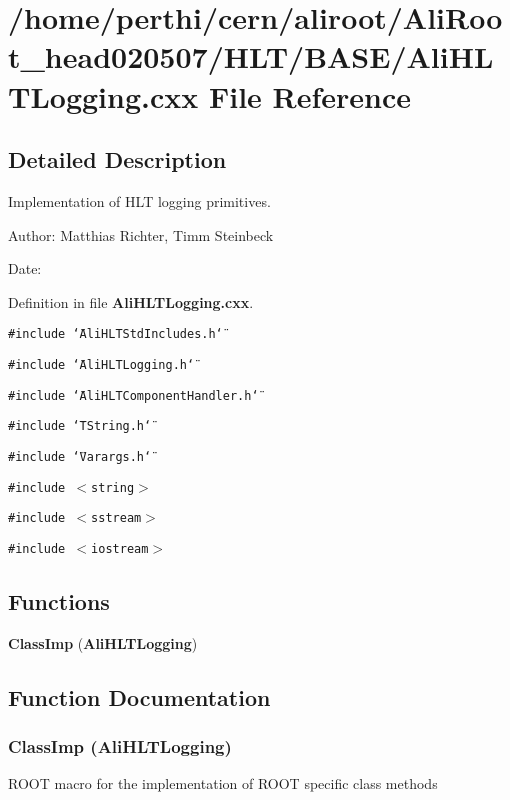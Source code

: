 \section{/home/perthi/cern/aliroot/Ali\-Root\_\-head020507/HLT/BASE/Ali\-HLTLogging.cxx File Reference}
\label{AliHLTLogging_8cxx}


\subsection{Detailed Description}
Implementation of HLT logging primitives. 

\begin{Desc}
\item[Author:]Matthias Richter, Timm Steinbeck \end{Desc}
\begin{Desc}
\item[Date:]\end{Desc}


Definition in file {\bf Ali\-HLTLogging.cxx}.

{\tt \#include \char`\"{}Ali\-HLTStd\-Includes.h\char`\"{}}\par
{\tt \#include \char`\"{}Ali\-HLTLogging.h\char`\"{}}\par
{\tt \#include \char`\"{}Ali\-HLTComponent\-Handler.h\char`\"{}}\par
{\tt \#include \char`\"{}TString.h\char`\"{}}\par
{\tt \#include \char`\"{}Varargs.h\char`\"{}}\par
{\tt \#include $<$string$>$}\par
{\tt \#include $<$sstream$>$}\par
{\tt \#include $<$iostream$>$}\par
\subsection*{Functions}
\begin{CompactItemize}
\item 
{\bf Class\-Imp} ({\bf Ali\-HLTLogging})
\end{CompactItemize}


\subsection{Function Documentation}
\subsubsection{\setlength{\rightskip}{0pt plus 5cm}Class\-Imp ({\bf Ali\-HLTLogging})}\label{AliHLTLogging_8cxx_a0}


ROOT macro for the implementation of ROOT specific class methods 